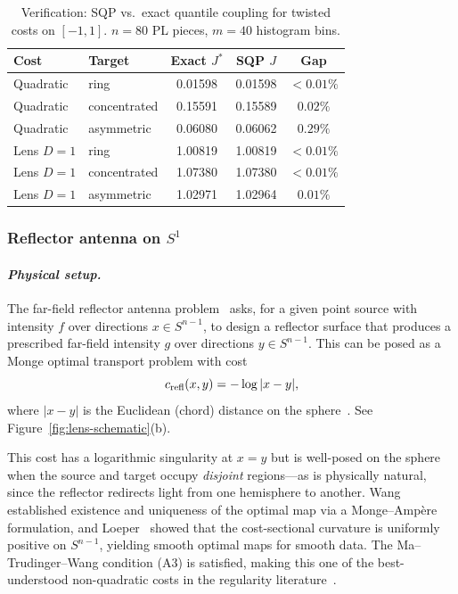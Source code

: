 \documentclass[12pt,leqno]{amsart}
\begin{document}
\begin{table}[t]
    \centering
    \caption{Verification: SQP vs.\ exact quantile coupling for twisted costs on $[-1,1]$.
    $n=80$ PL pieces, $m=40$ histogram bins.}
    \label{tab:lens-verification}
    \small
    \begin{tabular}{llccc}
        \toprule
        Cost & Target & Exact $J^*$ & SQP $J$ & Gap \\
        \midrule
        Quadratic & ring        & 0.01598 & 0.01598 & ${<}0.01\%$ \\
        Quadratic & concentrated & 0.15591 & 0.15589 & $0.02\%$ \\
        Quadratic & asymmetric  & 0.06080 & 0.06062 & $0.29\%$ \\
        Lens $D=1$ & ring       & 1.00819 & 1.00819 & ${<}0.01\%$ \\
        Lens $D=1$ & concentrated & 1.07380 & 1.07380 & ${<}0.01\%$ \\
        Lens $D=1$ & asymmetric & 1.02971 & 1.02964 & $0.01\%$ \\
        \bottomrule
    \end{tabular}
\end{table}


\subsubsection{Reflector antenna on $S^1$}\label{sec:exp-physics-s1}

\paragraph{\it Physical setup.}
The far-field reflector antenna problem~\citep{wang2004design,glimm2003optical} asks, for a given point source with intensity $f$ over directions $x \in S^{n-1}$, to design a reflector surface that produces a prescribed far-field intensity $g$ over directions $y \in S^{n-1}$.  This can be posed as a Monge optimal transport problem with cost
\begin{equation}\label{eq:reflector-cost}
    c_{\textup{refl}}(x,y) = -\log|x - y|,
\end{equation}
where $|x-y|$ is the Euclidean (chord) distance on the sphere~\citep{wang2004design}.  See Figure~\ref{fig:lens-schematic}(b).

This cost has a logarithmic singularity at $x = y$ but is well-posed on the sphere when the source and target occupy \emph{disjoint} regions---as is physically natural, since the reflector redirects light from one hemisphere to another.  Wang~\citep{wang2004design} established existence and uniqueness of the optimal map via a Monge--Amp\`ere formulation, and Loeper~\citep{loeper2011regularity} showed that the cost-sectional curvature is uniformly positive on $S^{n-1}$, yielding smooth optimal maps for smooth data.  The Ma--Trudinger--Wang condition (A3) is satisfied, making this one of the best-understood non-quadratic costs in the regularity literature~\citep{ma2005regularity,loeper2009regularity}.
\end{document}
